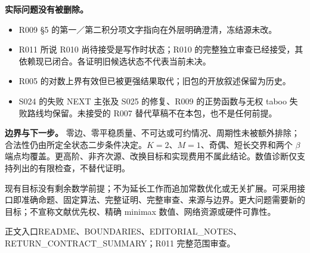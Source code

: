\documentclass[11pt,a4paper]{article}
\newcommand{\entry}[1]{\vfill{\noindent\small\raggedright 正文入口\quad #1\par}}
\begin{document}
\textbf{实际问题没有被删除。}
\begin{itemize}
\item R009 §5 的第一／第二积分项文字指向在外层明确澄清，冻结源未改。
\item R011 所说 R010 尚待接受是写作时状态；R010 的完整独立审查已经接受，其依赖现已闭合。各证明旧候选状态不代表当前未决。
\item R005 的对数上界有效但已被更强结果取代；旧包的开放叙述保留为历史。
\item S024 的失败 NEXT 主张及 S025 的修复、R009 的正势函数与无权 taboo 失败路线均保留。未接受的 R007 替代草稿不在本包，也不是任何前提。
\end{itemize}
\textbf{边界与下一步。} 零边、零平稳质量、不可达或可约情况、周期性未被额外排除；合法性仍由所定全状态二步条件决定。$K=2$、$M=1$、奇偶、短长交界和两个 $\beta$ 端点均覆盖。更高阶、非齐次源、改换目标和实现费用不属此结论。数值诊断仅支持列出的有限检查，不替代证明。

现有目标没有剩余数学前提；不为延长工作而追加常数优化或无关扩展。可采用接口即准确命题、固定算法、完整证明、完整审查、来源与边界。更大问题需要新的目标；不宣称文献优先权、精确 minimax 数值、网络资源或硬件可靠性。
\entry{README、BOUNDARIES、EDITORIAL\_NOTES、RETURN\_CONTRACT\_SUMMARY；R011 完整范围审查。}
\end{document}
